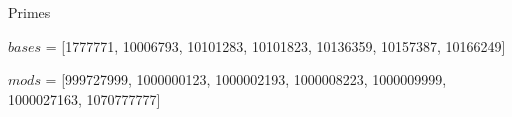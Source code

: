 Primes

$bases$ = [1777771, 10006793, 10101283, 10101823, 10136359, 10157387, 10166249]

$mods$ = [999727999, 1000000123, 1000002193, 1000008223, 1000009999, 1000027163, 1070777777] \\